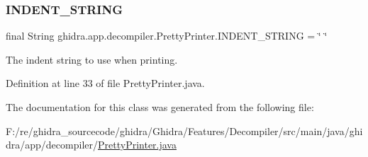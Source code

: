 \subsubsection{\texorpdfstring{INDENT\_STRING}{INDENT\_STRING}}
{\footnotesize\ttfamily final String ghidra.\+app.\+decompiler.\+Pretty\+Printer.\+I\+N\+D\+E\+N\+T\+\_\+\+S\+T\+R\+I\+NG = \char`\"{} \char`\"{}\hspace{0.3cm}{\ttfamily [static]}}

The indent string to use when printing. 

Definition at line 33 of file Pretty\+Printer.\+java.



The documentation for this class was generated from the following file\+:\begin{DoxyCompactItemize}
\item 
F\+:/re/ghidra\+\_\+sourcecode/ghidra/\+Ghidra/\+Features/\+Decompiler/src/main/java/ghidra/app/decompiler/\mbox{\hyperlink{_pretty_printer_8java}{Pretty\+Printer.\+java}}\end{DoxyCompactItemize}
